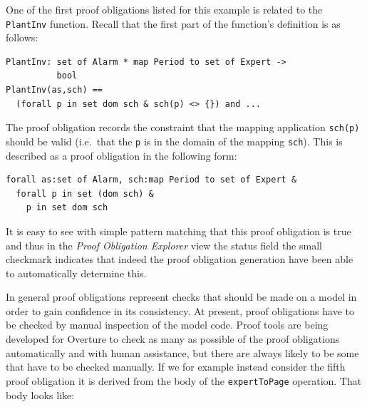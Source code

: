 One of the first proof obligations listed for this example is related
to the \texttt{PlantInv} function. Recall that the first part of the
function's definition is as follows:

\begin{lstlisting}
PlantInv: set of Alarm * map Period to set of Expert -> 
          bool
PlantInv(as,sch) ==
  (forall p in set dom sch & sch(p) <> {}) and ...
\end{lstlisting}


The proof obligation records the constraint that the mapping application
\texttt{sch(p)} should be valid (i.e.\ that the \texttt{p} is in the
domain of the mapping \texttt{sch}). This is described as a proof
obligation in the following form:

\begin{lstlisting}
forall as:set of Alarm, sch:map Period to set of Expert &
  forall p in set (dom sch) &
    p in set dom sch
\end{lstlisting}
It is easy to see with simple pattern matching that this proof
obligation is true and thus in the \emph{Proof Obligation Explorer}
view the status field the small checkmark indicates that indeed the
proof obligation generation have been able to automatically determine
this. 

In general proof obligations represent checks that should be made on a
model in order to gain confidence in its consistency. At present,
proof obligations have to be checked by manual inspection of the model
code. Proof tools are being developed for Overture to check as many as
possible of the proof obligations automatically and with human
assistance, but there are always likely to be some that have to be
checked manually. If we for example instead consider the fifth proof
obligation it is derived from the body of the \texttt{expertToPage}
operation. That body looks like:

